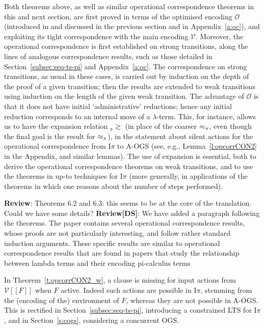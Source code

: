 \documentclass[11pt,a4paper]{amsart}
\theoremstyle{plain}
\theoremstyle{definition}
\theoremstyle{defC}
\theoremstyle{thmC}
\theoremstyle{plain}
\numberwithin{equation}{section}
\newcommand{\AOGS}{\mbox{{\rm A-OGS}}\xspace}      %
\newcommand{\rmm}[1]{{\tt{\lowercase{#1}}}}
\newcommand{\genwb}[1]{\mathrel{\approx_{\rmm{\lowercase{#1}}}}}       %
\newcommand{\wbPI}{\genwb{\pi}}       %
\newcommand{\contr}{\mathrel{\mbox{}_{\pi}\!\!\gtrsim}}
\newcommand{\FF}{F}
\newcommand{\cbvSymb}{{\mathcal {V}}}
\newcommand{\encoEnvI}[1]{ \cbvSymb[\! [ #1 ] \! ]  } %
\newcommand{\encoConI}{\encoEnvI} %
\newcommand{\qencV}{{\mathcal O}}  %
\newcommand{\Intp}{\mbox{I$\pi$}\xspace}   %
\newcommand{\piI}{\Intp}   %
\theoremstyle{plain}
\theoremstyle{definition}
\newcommand{\reviewComment}[1]{\textbf{Review}: {\color{red} #1}}
\newcommand{\reviewCommentDS}[1]{\textbf{Review[DS]}: {\color{green} #1}}
\newcommand{\reviewComment}[1]{}
\newcommand{\reviewCommentDS}[1]{}
\begin{document}
\noindent
Both theorems above,  as well as similar operational correspondence theorems in this and next
section,  are first proved in terms of the optimised encoding  $\qencV$ 
(introduced in \cite{DurierHS18} and discussed in the previous section and in 
Appendix~\ref{a:oc}), 
and exploiting its
tight correspondence with the main encoding $\cbvSymb$. 
Moreover, 
  the operational correspondence 
is first established 
on strong
transitions,  along the lines of analogous correspondence results, such as  those detailed  in
Section~\ref{subsec:seq-ts-pi}  and Appendix~\ref{a:oc}. 
The correspondence on strong transitions, as usual in these cases, 
is carried out by  induction on the depth of the proof of a given transition; then the
 results are extended to weak transitions using induction on the length of the  given weak
 transition.  
 The advantage of   $\qencV$ is that it does not have initial
`administrative' reductions; hence any initial reduction corresponds to an internal move
of a $\lambda$-term.   This, for instance, allows us to have 
 the expansion relation  $\contr$ (in place of the coarser $\wbPI$, even though the final
 goal is  the result for  $\wbPI$), 
in the  statement about silent actions for the 
operational correspondence from \piI to \AOGS 
(see,  e.g., Lemma~\ref{l:opcorrCON2} in the Appendix, and similar lemmas). 
The use of expansion 
is
essential, both to derive the  operational correspondence theorems  on weak transitions,  and to use
the theorems in up-to techniques for  $\piI$ (more generally, in applications of the
theorems in which one reasons about the number of steps performed). 


\reviewComment{
Theorems 6.2 and 6.3: this seems to be at the core of the
translation. Could we have some details?}
\reviewCommentDS{We have added a paragraph following the theorems. The paper contains
  several operational correspondence results, whose proofs are not particularly
  interesting, and follow rather standard induction arguments.  These specific results are
similar to operational correspondence results that are found in papers that study the
relationship between lambda terms and their encoding pi-calculus  terms }


In Theorem~\ref{t:opcorrCON2_w}, a  clause is 
 missing
 for
input actions from $ \encoConI \FF$ when 
 $\FF$ active. Indeed such actions are possible in \piI, stemming from the (encoding of
 the) environment of $\FF$, whereas they are not possible in \AOGS. This is rectified in
 Section~\ref{subsec:seq-ts-pi}, introducing a constrained LTS for \piI, and in Section~\ref{s:cogs}, 
 considering a concurrent OGS.   
 
\end{document}
